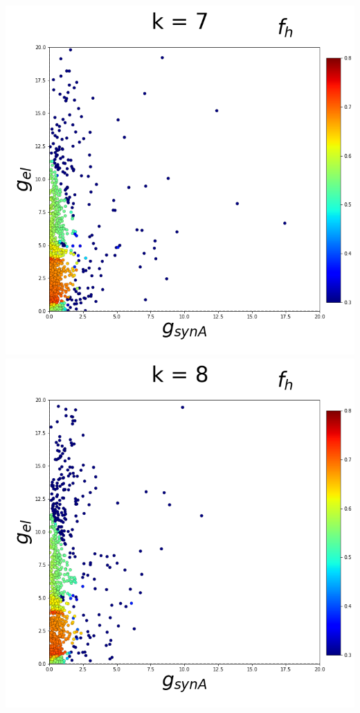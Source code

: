 \documentclass[11pt]{article}
\begin{document}
\begin{center}
\includegraphics[scale=0.125]{DSN_figs/STGCircuit_DSN_c=0_rs=4_k=7.png}
\includegraphics[scale=0.125]{DSN_figs/STGCircuit_DSN_c=0_rs=4_k=8.png}

\end{center}
\end{document}
